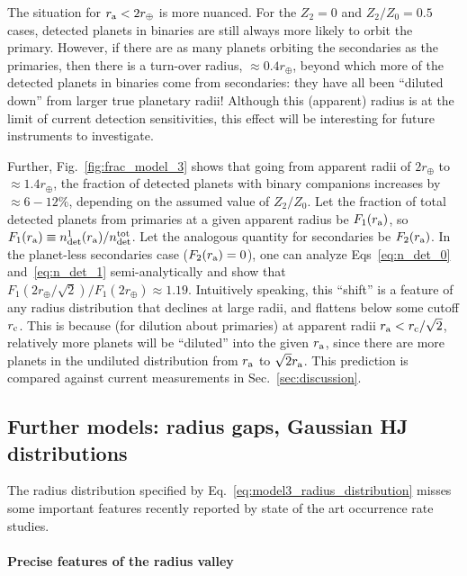 \documentclass[12pt,modern]{aastex61}
\renewcommand{\a}{_{\rm a}}
\begin{document}
The situation for $r\a < 2r_\oplus$ is more nuanced.
For the $Z_2=0$ and $Z_2/Z_0=0.5$ cases, detected planets in binaries are 
still always more likely to orbit the primary.
However, if there are as many planets orbiting the secondaries as the 
primaries, then there is a turn-over radius, $\approx 0.4r_\oplus$, 
beyond which more of the detected planets in binaries come from secondaries: 
they have all been ``diluted down'' from larger true planetary radii!
Although this (apparent) radius is at the limit of current detection 
sensitivities, this effect will be interesting for future instruments to 
investigate.

Further, Fig.~\ref{fig:frac_model_3} shows that going from apparent 
radii of $2r_\oplus$ to $\approx 1.4r_\oplus$, the fraction of detected 
planets with binary companions increases by $\approx 6-12\%$, depending on the 
assumed value of $Z_2/Z_0$.
Let the fraction of total detected planets from primaries at a given 
apparent radius be $F_1(r\a)$, so $F_1(r\a) \equiv n_{\rm det}^1(r\a)/n_{\rm 
det}^{\rm tot}$.
Let the analogous quantity for secondaries be $F_2(r\a)$.
In the planet-less secondaries case ($F_2(r\a)=0$), one can 
analyze Eqs~\ref{eq:n_det_0} and~\ref{eq:n_det_1} semi-analytically and show 
that $F_1(2r_\oplus/\sqrt{2})/F_1(2r_\oplus) \approx 1.19$.
Intuitively speaking, this ``shift'' is a feature of any radius distribution 
that declines at large radii, and flattens below some cutoff $r_{\rm c}$.
This is because (for dilution about primaries)
at apparent radii $r\a < r_{\rm c}/\sqrt{2}$, relatively more planets will be 
``diluted'' into the given $r\a$, since there are more planets in 
the undiluted distribution from $r\a$ to $\sqrt{2}r\a$.
This prediction is compared against current measurements in 
Sec.~\ref{sec:discussion}.



\subsection{Further models: radius gaps, Gaussian HJ distributions}
\label{sec:further_models}

The radius distribution specified by Eq.~\ref{eq:model3_radius_distribution} 
misses some important features recently reported by state of the art 
occurrence rate studies.

\paragraph{Precise features of the radius valley}
\end{document}

